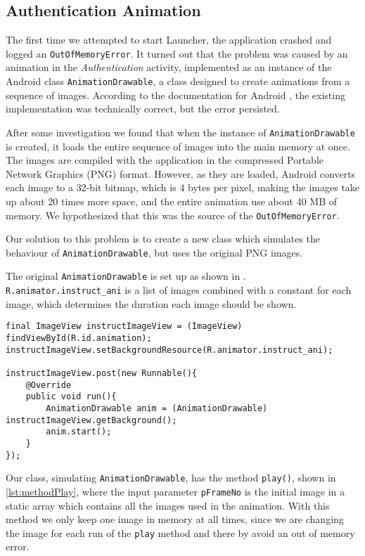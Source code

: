 \subsection{Authentication Animation}
The first time we attempted to start Launcher, the application crashed and logged an \lstinline{OutOfMemoryError}.
It turned out that the problem was caused by an animation in the \textit{Authentication} activity, implemented as an instance of the Android class \lstinline{AnimationDrawable}, a class designed to create animations from a sequence of images.
According to the documentation for Android \citet{androidreference}, the existing implementation was technically correct, but the error persisted.

After some investigation we found that when the instance of \lstinline{AnimationDrawable} is created, it loads the entire sequence of images into the main memory at once.
The images are compiled with the application in the compressed Portable Network Graphics (PNG) format.
However, as they are loaded, Android converts each image to a 32-bit bitmap, which is 4 bytes per pixel, making the images take up about 20 times more space, and the entire animation use about 40 MB of memory. We hypothesized that this was the source of the \lstinline{OutOfMemoryError}.

Our solution to this problem is to create a new class which simulates the behaviour of \lstinline{AnimationDrawable}, but uses the original PNG images.

The original \lstinline{AnimationDrawable} is set up as shown in . 
\lstinline{R.animator.instruct_ani} is a list of images combined with a constant for each image, which determines the duration each image should be shown.

\begin{lstlisting}[caption={The original animation implementation, using \lstinline{AnimationDrawable}.},label={lst:animationDrawable}]
final ImageView instructImageView = (ImageView) findViewById(R.id.animation);
instructImageView.setBackgroundResource(R.animator.instruct_ani);

instructImageView.post(new Runnable(){
    @Override
    public void run(){
        AnimationDrawable anim = (AnimationDrawable) instructImageView.getBackground();
        anim.start();
    }
});
\end{lstlisting}

Our class, simulating \lstinline{AnimationDrawable}, has the method \lstinline{play()}, shown in \cref{lst:methodPlay}, where the input parameter \lstinline{pFrameNo} is the initial image in a static array which contains all the images used in the animation. 
With this method we only keep one image in memory at all times, since we are changing the image for each run of the \lstinline{play} method and there by avoid an out of memory error.


